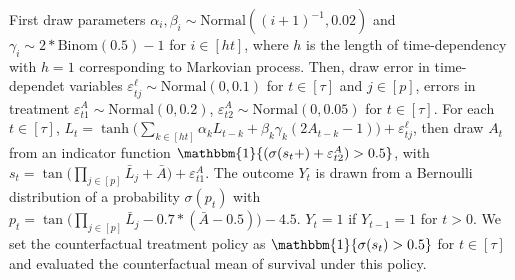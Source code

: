 \documentclass{article}
\theoremstyle{plain}
\theoremstyle{definition}
\theoremstyle{remark}
\begin{document}
First draw parameters $\alpha_i,\beta_i\sim\mathrm{Normal}((i+1)^{-1},0.02)$ and $\gamma_i\sim 2 * \mathrm{Binom}(0.5) - 1$ for $i\in[ht]$, where $h$ is the length of time-dependency with $h=1$ corresponding to Markovian process. Then, draw error in time-dependet variables $\varepsilon^\ell_{tj}\sim\mathrm{Normal}(0,0.1)$ for $t\in[\tau]$ and $j\in[p]$, errors in treatment $\varepsilon^A_{t1}\sim\mathrm{Normal}(0,0.2)$, $\varepsilon^A_{t2}\sim\mathrm{Normal}(0,0.05)$ for $t\in[\tau]$. For each $t\in[\tau]$, $L_t=\tanh\big(\sum_{k\in[ht]}\alpha_k L_{t-k}+\beta_k\gamma_k(2A_{t-k}-1)\big) + \varepsilon^\ell_{tj}$, then draw $A_t$ from an indicator function $\mathbbm{1}\{(\sigma(s_t+)+\varepsilon^A_{t2})>0.5\}$, with $s_t=\tan\big(\prod_{j\in[p]}\bar{L}_j
 + \bar{A}\big) + \varepsilon^A_{t1}$. The outcome $Y_t$ is drawn from a Bernoulli distribution of a probability $\sigma(p_t)$ with $p_t=\tan\big(\prod_{j\in[p]}\bar{L}_j
 - 0.7 * (\bar{A} - 0.5)) - 4.5$. $Y_t=1$ if $Y_{t-1}=1$ for $t>0$. We set the counterfactual treatment policy as $\mathbbm{1}\{\sigma(s_t)>0.5\}$ for $t\in[\tau]$ and evaluated the counterfactual mean of survival under this policy.



\end{document}
